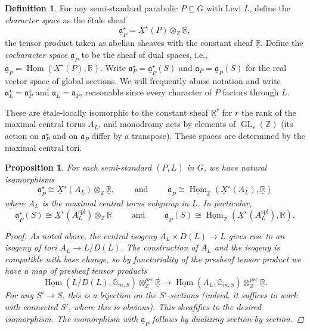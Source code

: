 \documentclass[openany]{amsbook}
\newtheorem{proposition}[theorem]{Proposition}
\theoremstyle{definition}
\newtheorem{definition}[theorem]{Definition}
\theoremstyle{remark}
\numberwithin{equation}{section}
\newcommand{\R}{\mathbb{R}}
\newcommand{\Z}{\mathbb{Z}}
\newcommand{\G}{\mathbb{G}}
\newcommand{\ul}[1]{\underline{#1}}
\renewcommand{\-}{\operatorname{-}}
\newcommand{\Hom}{\operatorname{Hom}}
\newcommand{\GL}{\operatorname{GL}}
\renewcommand{\a}{\mathfrak{a}}
\newcommand{\spl}{\mathrm{spl}}
\begin{document}
\begin{definition}\label{def.char.space}
    For any semi-standard parabolic $P \subseteq G$ with Levi $L$, define the \textit{character space} as the \'etale sheaf
    \[
        \ul{\a}^\star_P = \ul{X}^\star(P) \otimes_{\ul{\Z}} \ul{\R},
    \]
    the tensor product taken as abelian sheaves with the constant sheaf $\ul{\R}$.  Define the \textit{cocharacter space} $\ul{\a}_P$ to be the sheaf of dual spaces, i.e., $\ul{\a}_P = \ul{\Hom}(\ul{X}^\star(P), \ul{\R})$. Write $\a_P^\star = \ul{\a}_P^\star(S)$ and $\a_P = \ul{\a}_P(S)$ for the real vector space of global sections. We will frequently abuse notation and write $\a_L^\star = \a_P^\star$ and $\a_L = \a_P$, reasonable since every character of $P$ factors through $L$.
\end{definition}
These are \'etale-locally isomorphic to the constant sheaf $\ul{\R}^r$ for $r$ the rank of the maximal central torus $A_L$, and monodromy acts by elements of $\GL_r(\Z)$ (its action on $\a^\star_P$ and on $\a_P$ differ by a transpose). These spaces are determined by the maximal central tori.
\begin{proposition}\label{prop.char.space.centr.torus}
    For each semi-standard $(P, L)$ in $G$, we have natural isomorphisms
    \[
        \ul{\a}^\star_P \cong \ul{X}^\star(A_L) \otimes_{\ul{\Z}} \ul{\R}, \qquad \text{ and } \qquad \ul{\a}_P \cong \ul{\Hom}_{\ul{\Z}}(\ul{X}^\star(A_L), \ul{\R})
    \]
    where $A_L$ is the maximal central torus subgroup in $L$. In particular, 
    $$
    \ul{\a}_P^\star(S) \cong \ul{X}^\star(A_L^{\spl}) \otimes_{\Z} \R \qquad \text{ and } \qquad \ul{\a}_P(S) \cong \ul{\Hom}_{\Z}(\ul{X}^\star(A_L^{\spl}), \R).
    $$
    \begin{proof}
        As noted above, the central isogeny $A_L \times D(L) \to L$ gives rise to an isogeny of tori $A_L \to L/D(L)$. The construction of $A_L$ and the isogeny is compatible with base change, so by functoriality of the presheaf tensor product we have a map of presheaf tensor products
        \[
            \ul{\Hom}(L/D(L), \G_{m,S}) \otimes^{pre}_{\ul{\Z}} \ul{\R} \longrightarrow \ul{\Hom}(A_L, \G_{m,S}) \otimes^{pre}_{\ul{\Z}} \ul{\R}.
        \]
        For any $S' \to S$, this is a bijection on the $S'$-sections (indeed, it suffices to work with connected $S'$, where this is obvious). This sheafifies to the desired isomorphism. The isomorphism with $\ul{\a}_P$ follows by dualizing section-by-section.
    \end{proof}
\end{proposition}
\end{document}
